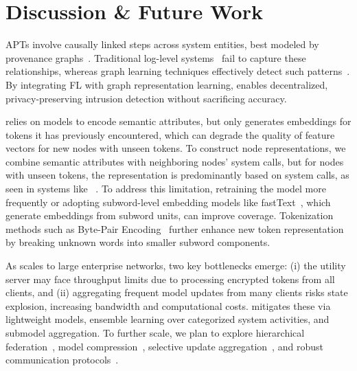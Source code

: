 \section{Discussion \& Future Work}
\label{sec:discussion}





APTs involve causally linked steps across system entities, best modeled by provenance graphs~\cite{inam2023sok}. Traditional log-level systems~\cite{deeplog2017,liu2019log2vec,xia2019loggan} fail to capture these relationships, whereas graph learning techniques effectively detect such patterns~\cite{flash2024,cheng2023kairos,jia2023magic}. By integrating FL with graph representation learning, \Sys enables decentralized, privacy-preserving intrusion detection without sacrificing accuracy.

 \Sys relies on \wordvec models to encode semantic attributes, but \wordvec only generates embeddings for tokens it has previously encountered, which can degrade the quality of feature vectors for new nodes with unseen tokens. To construct node representations, we combine semantic attributes with neighboring nodes' system calls, but for nodes with unseen tokens, the representation is predominantly based on system calls, as seen in systems like \threatrace~\cite{wang2022threatrace}. To address this limitation, retraining the \wordvec model more frequently or adopting subword-level embedding models like fastText~\cite{joulin2016bag}, which generate embeddings from subword units, can improve coverage. Tokenization methods such as Byte-Pair Encoding~\cite{araabi2022effective} further enhance new token representation by breaking unknown words into smaller subword components.

As \Sys scales to large enterprise networks, two key bottlenecks emerge: (i) the utility server may face throughput limits due to processing encrypted tokens from all clients, and (ii) aggregating frequent model updates from many clients risks state explosion, increasing bandwidth and computational costs. \Sys mitigates these via lightweight models, ensemble learning over categorized system activities, and submodel aggregation. To further scale, we plan to explore hierarchical federation~\cite{zhong2022flee}, model compression~\cite{choudhary2020comprehensive}, selective update aggregation~\cite{ye2020federated}, and robust communication protocols~\cite{laclau2020robust}.


